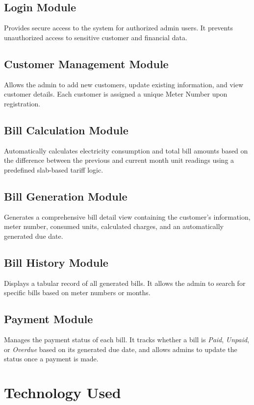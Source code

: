 \documentclass[a4paper,12pt]{article}
\begin{document}
\subsection{Login Module}
Provides secure access to the system for authorized admin users. It prevents unauthorized access to sensitive customer and financial data.

\subsection{Customer Management Module}
Allows the admin to add new customers, update existing information, and view customer details. Each customer is assigned a unique Meter Number upon registration.

\subsection{Bill Calculation Module}
Automatically calculates electricity consumption and total bill amounts based on the difference between the previous and current month unit readings using a predefined slab-based tariff logic.

\subsection{Bill Generation Module}
Generates a comprehensive bill detail view containing the customer's information, meter number, consumed units, calculated charges, and an automatically generated due date.

\subsection{Bill History Module}
Displays a tabular record of all generated bills. It allows the admin to search for specific bills based on meter numbers or months.

\subsection{Payment Module}
Manages the payment status of each bill. It tracks whether a bill is \textit{Paid}, \textit{Unpaid}, or \textit{Overdue} based on its generated due date, and allows admins to update the status once a payment is made.


\section{Technology Used}
\end{document}
